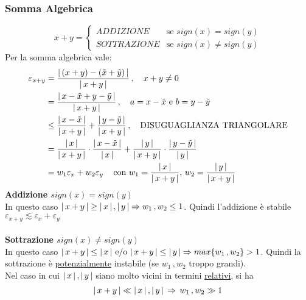 \subsubsection{Somma Algebrica}
\[x+y = 
\begin{cases}
ADDIZIONE & \text{se $sign(x)=sign(y)$} \\
SOTTRAZIONE & \text{se $sign(x) \ne sign(y)$}
\end{cases}
\]
Per la somma algebrica vale:
\[\begin{split}
\varepsilon_{x+y} & = \frac{\abs*{\,(x + y) - (\Tilde{x} + \Tilde{y})\,}}{\abs*{\,x + y\,}} \,, \quad x + y \ne 0 \\
& = \frac{\abs*{\,x - \Tilde{x} + y - \Tilde{y}\,}}{\abs*{\,x + y\,}} \,, \quad a = x - \Tilde{x} \text{ e } b = y - \Tilde{y} \\
& \le \frac{\abs*{\,x - \Tilde{x}\,}}{\abs*{\,x + y\,}} + \frac{\abs*{\,y - \Tilde{y}\,}}{\abs*{\,x + y\,}} \,, \quad \text{DISUGUAGLIANZA TRIANGOLARE} \\
& = \frac{\abs*{\,x\,}}{\abs*{\,x + y\,}} \cdot \frac{\abs*{\,x - \Tilde{x}\,}}{\abs*{\,x\,}} + \frac{\abs*{\,y\,}}{\abs*{\,x + y\,}} \cdot \frac{\abs*{\,y - \Tilde{y}\,}}{\abs*{\,y\,}} \\
& = w_1 \varepsilon_x + w_2 \varepsilon_y \, \quad \text{con $w_1=\frac{\abs*{\,x\,}}{\abs*{\,x + y\,}}$, $w_2=\frac{\abs*{\,y\,}}{\abs*{\,x + y\,}}$}
\end{split}\]
\textbf{Addizione $sign(x)=sign(y)$}\\
In questo caso $\abs*{\,x + y\,} \ge \abs*{\,x\,}\,,\abs*{\,y\,} \Rightarrow w_1\,,w_2 \le 1$. Quindi l'addizione è stabile $\varepsilon_{x+y}\lesssim \varepsilon_x+\varepsilon_y$
\\\\\textbf{Sottrazione $sign(x)\ne sign(y)$}\\
In questo caso $\abs*{\,x + y\,} \le \abs*{\,x\,} \text{ e/o } \abs*{\,x + y\,} \le \abs*{\,y\,} \Rightarrow max\{w_1\,,w_2\} > 1$. Quindi la sottrazione è \underline{potenzialmente} instabile (se $w_1\,,w_2$ troppo grandi).\\
Nel caso in cui $\abs*{\,x\,}\,,\abs*{\,y\,}$ siano molto vicini in termini \underline{relativi}, si ha
\[
\abs*{\,x + y\,} \ll \abs*{\,x\,}\,,\abs*{\,y\,} \, \Rightarrow \, w_1\,,w_2 \gg 1
\]

